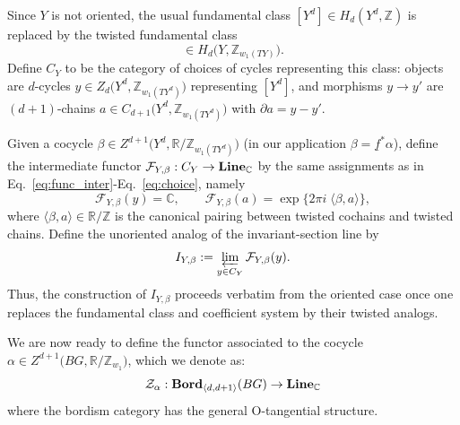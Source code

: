 \documentclass[aps,prx,reprint,superscriptaddress,twocolumn,amsmath,amssymb,amsfonts, nofootinbib]{revtex4-2}
\newcommand{\bordd}{{\bf Bord}_{\langle d, d+1\rangle}}
\newcommand{\Line}{{\bf Line}_{\mathbb{C}}}
\newcommand{\Z}{\mathbb{Z}}
\theoremstyle{apsstyle}
\begin{document}
\bigskip


Since $Y$ is not oriented, the usual fundamental class $[Y^{d}]\in H_{d}(Y^{d},\Z)$ is replaced by the twisted fundamental class
\begin{equation*}
[Y^{d}]\in H_{d}\bigl(Y,\Z_{w_{1}(TY)}\bigr).
\end{equation*}
Define $C_{Y}$ to be the category of choices of cycles representing this class: objects are $d$-cycles $y\in Z_{d}\bigl(Y^{d},\Z_{w_{1}(TY^{d})}\bigr)$ representing $[Y^{d}]$, and morphisms $y\to y'$ are $(d+1)$-chains $a\in C_{d+1}\bigl(Y^{d},\Z_{w_{1}(TY^{d})}\bigr)$ with $\partial a=y-y'$.

\bigskip 

\noindent Given a cocycle $\beta\in Z^{d+1}\bigl(Y^{d},\mathbb{R}/\Z_{w_{1}(TY^{d})}\bigr)$ (in our application $\beta=\underline f^{*}\alpha$), define the intermediate functor $\mathcal F_{Y,\beta}:C_{Y}\to \Line$ by the same assignments as in Eq.~\eqref{eq:func_inter}-Eq.~\eqref{eq:choice}, namely
\begin{equation*}
\mathcal F_{Y,\beta}(y)=\mathbb{C},
\qquad
\mathcal F_{Y,\beta}(a)=\exp\{2\pi i \; \langle \beta,a\rangle\},
\end{equation*}
where $\langle \beta,a\rangle\in \mathbb{R}/\Z$ is the canonical pairing between twisted cochains and twisted chains. Define the unoriented analog of the invariant-section line by
\begin{equation*}
I_{Y,\beta}:=\varprojlim_{y\in C_{Y}}\mathcal F_{Y,\beta}(y).
\end{equation*}
Thus, the construction of $I_{Y,\beta}$ proceeds verbatim from the oriented case once one replaces the fundamental class and coefficient system by their twisted analogs.

\bigskip

We are now ready to define the functor associated to the cocycle $\alpha\in Z^{d+1}\bigl(BG,\mathbb{R}/\Z_{w_{1}}\bigr)$, which we denote as:
\begin{equation*}
    \mathcal{Z}_{\alpha}: \bordd(BG) \to \Line
\end{equation*}
where the bordism category has the general $\mathrm{O}$-tangential structure. 

\bigskip 
\end{document}
